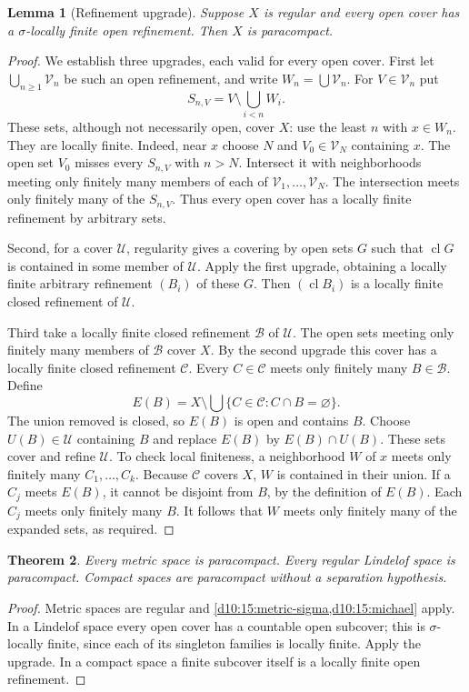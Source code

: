 \documentclass[11pt,oneside,openany]{book}
\newtheorem{theorem}{Theorem}[chapter]
\newtheorem{lemma}[theorem]{Lemma}
\theoremstyle{definition}
\theoremstyle{remark}
\DeclareMathOperator{\cl}{cl}
\begin{document}
\begin{lemma}[Refinement upgrade]\label{d10:15:michael}
Suppose $X$ is regular and every open cover has a $\sigma$-locally finite
open refinement. Then $X$ is paracompact.
\end{lemma}
\begin{proof}
We establish three upgrades, each valid for every open cover.
First let $\bigcup_{n\geq1}\mathcal V_n$ be such an open refinement, and
write $W_n=\bigcup\mathcal V_n$. For $V\in\mathcal V_n$ put
\[
 S_{n,V}=V\setminus\bigcup_{i<n}W_i.
\]
These sets, although not necessarily open, cover $X$: use the least $n$
with $x\in W_n$. They are locally finite. Indeed, near $x$ choose
$N$ and $V_0\in\mathcal V_N$ containing $x$. The open set $V_0$
misses every $S_{n,V}$ with $n>N$. Intersect it with neighborhoods meeting
only finitely many members of each of $\mathcal V_1,\ldots,\mathcal V_N$.
The intersection meets only finitely many of the $S_{n,V}$.
Thus every open cover has a locally finite refinement by arbitrary sets.

Second, for a cover $\mathcal U$, regularity gives a covering by open
sets $G$ such that $\cl G$ is contained in some member of $\mathcal U$.
Apply the first upgrade, obtaining a locally finite arbitrary refinement
$(B_i)$ of these $G$. Then $(\cl B_i)$ is a locally finite closed
refinement of $\mathcal U$.

Third take a locally finite closed refinement $\mathcal B$ of $\mathcal U$.
The open sets meeting only finitely many members of $\mathcal B$ cover $X$.
By the second upgrade this cover has a locally finite closed refinement
$\mathcal C$. Every $C\in\mathcal C$ meets only finitely many $B\in\mathcal B$.
Define
\[
 E(B)=X\setminus\bigcup\{C\in\mathcal C:C\cap B=\varnothing\}.
\]
The union removed is closed, so $E(B)$ is open and contains $B$.
Choose $U(B)\in\mathcal U$ containing $B$ and replace $E(B)$ by
$E(B)\cap U(B)$. These sets cover and refine $\mathcal U$.
To check local finiteness, a neighborhood $W$ of $x$ meets only finitely
many $C_1,\ldots,C_k$. Because $\mathcal C$ covers $X$, $W$ is contained
in their union. If a $C_j$ meets $E(B)$, it cannot be disjoint from $B$,
by the definition of $E(B)$. Each $C_j$ meets only finitely many $B$.
It follows that $W$ meets only finitely many of the expanded sets, as required.
\end{proof}

\begin{theorem}\label{d10:15:metric-paracompact}
Every metric space is paracompact. Every regular Lindelof space is
paracompact. Compact spaces are paracompact without a separation hypothesis.
\end{theorem}
\begin{proof}
Metric spaces are regular and \cref{d10:15:metric-sigma,d10:15:michael}
apply. In a Lindelof space every open cover has a countable open
subcover; this is $\sigma$-locally finite, since each of its singleton
families is locally finite. Apply the upgrade. In a compact space a
finite subcover itself is a locally finite open refinement.
\end{proof}
\end{document}
